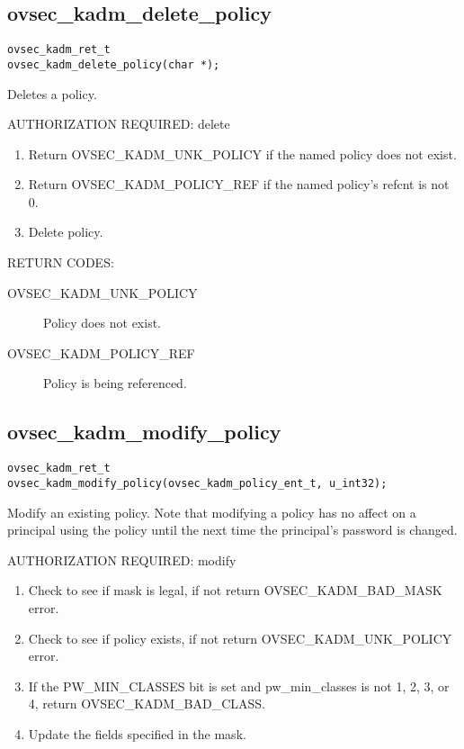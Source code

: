 \subsection{ovsec_kadm_delete_policy}

\begin{verbatim}
ovsec_kadm_ret_t
ovsec_kadm_delete_policy(char *);
\end{verbatim}

Deletes a policy.

AUTHORIZATION REQUIRED: delete

\begin{enumerate}
\item Return OVSEC_KADM_UNK_POLICY if the named policy does not exist.
\item Return OVSEC_KADM_POLICY_REF if the named policy's refcnt is not 0.
\item Delete policy.
\end{enumerate}

RETURN CODES:

\begin{description}
\item[OVSEC_KADM_UNK_POLICY] Policy does not exist.
\item[OVSEC_KADM_POLICY_REF] Policy is being referenced. 
\end{description}

\subsection{ovsec_kadm_modify_policy}

\begin{verbatim}
ovsec_kadm_ret_t
ovsec_kadm_modify_policy(ovsec_kadm_policy_ent_t, u_int32);
\end{verbatim}

Modify an existing policy.  Note that modifying a policy has no affect
on a principal using the policy until the next time the principal's
password is changed.

AUTHORIZATION REQUIRED: modify

\begin{enumerate}
\item Check to see if mask is legal, if not return OVSEC_KADM_BAD_MASK error.
\item Check to see if policy exists, if not return
OVSEC_KADM_UNK_POLICY error.
\item If the PW_MIN_CLASSES bit is set and pw_min_classes is not 1, 2,
3, or 4, return OVSEC_KADM_BAD_CLASS.
\item Update the fields specified in the mask.
\end{enumerate}

